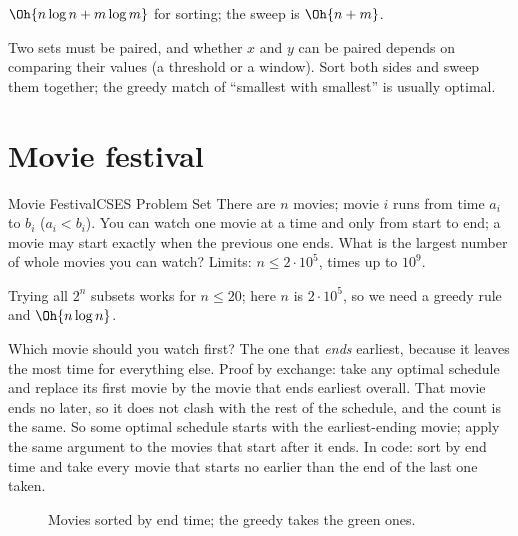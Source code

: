  $\Oh{n\log n + m\log m}$ for sorting; the sweep is $\Oh{n + m}$.

\begin{recognize}
Two sets must be paired, and whether $x$ and $y$ can be paired depends on comparing their values (a threshold or a
window). Sort both sides and sweep them together; the greedy match of ``smallest with smallest'' is usually optimal.
\end{recognize}

\section[Movie festival]{Movie festival \hfill \silver}\label{wp:movies}

\begin{statement}{Movie Festival}{CSES Problem Set}
There are $n$ movies; movie $i$ runs from time $a_i$ to $b_i$ ($a_i < b_i$). You can watch one movie at a time and only
from start to end; a movie may start exactly when the previous one ends. What is the largest number of whole movies you
can watch? Limits: $n \le 2\cdot 10^5$, times up to $10^9$.
\end{statement}

 Trying all $2^n$ subsets works for $n \le 20$; here $n$ is $2\cdot10^5$, so we need a greedy rule
and $\Oh{n\log n}$.

 Which movie should you watch first? The one that \emph{ends} earliest, because it leaves the most
time for everything else. Proof by exchange: take any optimal schedule and replace its first movie by the movie that ends
earliest overall. That movie ends no later, so it does not clash with the rest of the schedule, and the count is the same.
So some optimal schedule starts with the earliest-ending movie; apply the same argument to the movies that start after it
ends. In code: sort by end time and take every movie that starts no earlier than the end of the last one taken.

\begin{figure}[H]
\centering
{}
\caption{Movies sorted by end time; the greedy takes the green ones.}
\end{figure}

